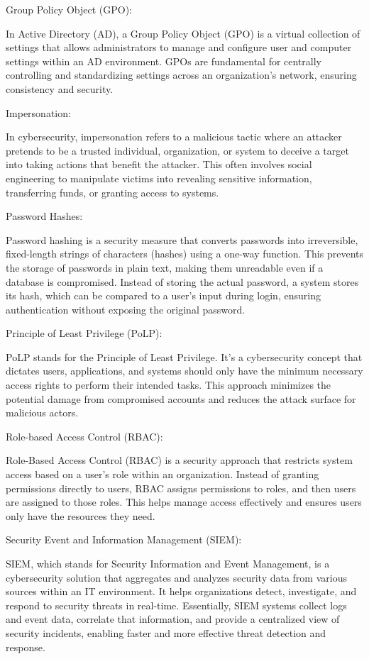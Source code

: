 Group Policy Object (GPO):

In Active Directory (AD), a Group Policy Object (GPO) is a virtual collection of settings that allows administrators to manage and configure user and computer settings within an AD environment. GPOs are fundamental for centrally controlling and standardizing settings across an organization's network, ensuring consistency and security.

Impersonation:

In cybersecurity, impersonation refers to a malicious tactic where an attacker pretends to be a trusted individual, organization, or system to deceive a target into taking actions that benefit the attacker. This often involves social engineering to manipulate victims into revealing sensitive information, transferring funds, or granting access to systems.

Password Hashes:

Password hashing is a security measure that converts passwords into irreversible, fixed-length strings of characters (hashes) using a one-way function. This prevents the storage of passwords in plain text, making them unreadable even if a database is compromised. Instead of storing the actual password, a system stores its hash, which can be compared to a user's input during login, ensuring authentication without exposing the original password.

Principle of Least Privilege (PoLP):

PoLP stands for the Principle of Least Privilege. It's a cybersecurity concept that dictates users, applications, and systems should only have the minimum necessary access rights to perform their intended tasks. This approach minimizes the potential damage from compromised accounts and reduces the attack surface for malicious actors.

Role-based Access Control (RBAC):

Role-Based Access Control (RBAC) is a security approach that restricts system access based on a user's role within an organization. Instead of granting permissions directly to users, RBAC assigns permissions to roles, and then users are assigned to those roles. This helps manage access effectively and ensures users only have the resources they need.

Security Event and Information Management (SIEM):

SIEM, which stands for Security Information and Event Management, is a cybersecurity solution that aggregates and analyzes security data from various sources within an IT environment. It helps organizations detect, investigate, and respond to security threats in real-time. Essentially, SIEM systems collect logs and event data, correlate that information, and provide a centralized view of security incidents, enabling faster and more effective threat detection and response.

